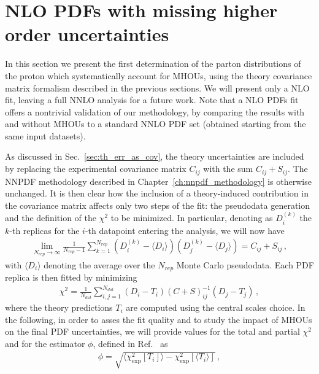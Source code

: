     
    \section{NLO PDFs with missing higher order uncertainties}
    \label{sec:th_error_results}
    In this section we present the first determination of the parton distributions of the proton 
    which systematically account for MHOUs,
    using the theory covariance matrix formalism described in the previous sections.
    We will present only a NLO fit, leaving a full NNLO analysis for a future work.
    Note that a NLO PDFs fit offers a nontrivial validation of our methodology, by comparing the results with and without MHOUs to 
    a standard NNLO PDF set (obtained starting from the same input datasets).

    As discussed in Sec.~\ref{sec:th_err_as_cov}, the theory uncertainties are included by replacing the
    experimental covariance matrix $C_{ij}$ with the sum $C_{ij}+S_{ij}$. The NNPDF methodology 
    described in Chapter~\ref{ch:nnpdf_methodology} is otherwise unchanged.
    It is then clear how the inclusion of a theory-induced contribution in the covariance matrix affects only two steps
    of the fit: the pseudodata generation and the definition of the $\chi^2$ to be minimized.
    In particular, denoting as $D_i^{(k)}$ the $k$-th replicas for the $i$-th datapoint entering the analysis,
    we will now have
    \begin{align}
        \lim_{N_{rep}\rightarrow \infty}\frac{1}{N_{rep}-1}
        \sum_{k=1}^{N_{rep}}\left(D_i^{(k)}-\langle D_i \rangle\right)\left(D_j^{(k)}-\langle D_j \rangle\right)
        = C_{ij} + S_{ij}\,,
    \end{align}
    with $\langle D_i \rangle$ denoting the average over the $N_{rep}$ Monte Carlo pseudodata.
    Each PDF replica is then fitted by minimizing 
    \begin{align}
        \chi^2 = \frac{1}{N_{dat}}\sum_{i,j=1}^{N_{dat}}
        \left(D_i - T_i\right)\left(C+S\right)_{ij}^{-1}\left(D_j-T_j\right)\,,
    \end{align}
    where the theory predictions $T_i$ are computed using the central scales choice.
    In the following, in order to asses the fit quality and to study the impact of MHOUs on the final
    PDF uncertainties, we will provide values for the total and partial $\chi^2$ and for the estimator
    $\phi$, defined in Ref.~\cite{Ball:2014uwa} as
    \begin{align}
        \label{eq:phi}
        \phi = \sqrt{\langle \chi^2_{\text{exp}}\left[T_i\right] \rangle - \chi^2_{\text{exp}}\left[\langle T_i \rangle\right]}\,,
    \end{align}
